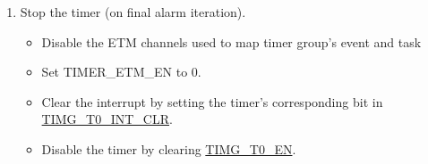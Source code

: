 \documentclass[main\_\_EN.tex]{subfiles}
\begin{document}
\begin{enumerate}
\begin{itemize}
        \item If \hyperref[fielddesc:TIMGTXAUTORELOAD]{TIMG\_T0\_AUTORELOAD} is 0, the current counter value is overwritten by the reloaded value because of the TIMER\_TASK\_CNT\_RELOAD\_TIMER0 (:0-1). The alarm generation will be reopen by TIMER\_TASK\_ALARM\_START\_TIMER0 (:0-1).
    \end{itemize}
    \item Stop the timer (on final alarm iteration).
    \begin{itemize}
        \item Disable the ETM channels used to map timer group's event and task
        \item Set TIMER\_ETM\_EN to 0.
        \item Clear the interrupt by setting the timer's corresponding bit in \hyperref[fielddesc:TIMGT0INTCLR]{TIMG\_T0\_INT\_CLR}.
        \item Disable the timer by clearing \hyperref[fielddesc:TIMGTXEN]{TIMG\_T0\_EN}.  
    \end{itemize}
\end{enumerate}
\end{document}
